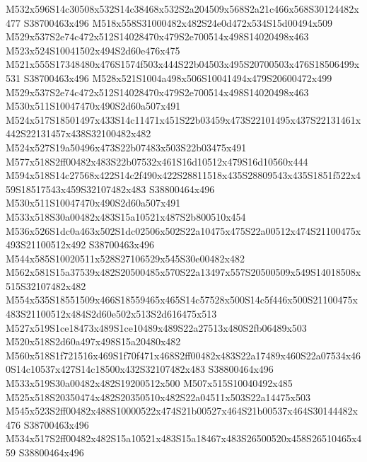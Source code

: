 \documentclass{article}
\begin{document}
\begin{multicols}{2}
M532x596S14c30508x532S14c38468x532S2a204509x568S2a21c466x568S30124482x477 S38700463x496 M518x558S31000482x482S24e0d472x534S15d00494x509 M529x537S2e74c472x512S14028470x479S2e700514x498S14020498x463 M523x524S10041502x494S2d60e476x475 M521x555S17348480x476S1574f503x444S22b04503x495S20700503x476S18506499x531 S38700463x496 M528x521S1004a498x506S10041494x479S20600472x499 M529x537S2e74c472x512S14028470x479S2e700514x498S14020498x463 M530x511S10047470x490S2d60a507x491 M524x517S18501497x433S14c11471x451S22b03459x473S22101495x437S22131461x442S22131457x438S32100482x482 M524x527S19a50496x473S22b07483x503S22b03475x491 M577x518S2ff00482x483S22b07532x461S16d10512x479S16d10560x444 M594x518S14c27568x422S14c2f490x422S28811518x435S28809543x435S1851f522x459S18517543x459S32107482x483 S38800464x496 M530x511S10047470x490S2d60a507x491 M533x518S30a00482x483S15a10521x487S2b800510x454 M536x526S1dc0a463x502S1dc02506x502S22a10475x475S22a00512x474S21100475x493S21100512x492 S38700463x496 M544x585S10020511x528S27106529x545S30e00482x482 M562x581S15a37539x482S20500485x570S22a13497x557S20500509x549S14018508x515S32107482x482 M554x535S18551509x466S18559465x465S14c57528x500S14c5f446x500S21100475x483S21100512x484S2d60e502x513S2d616475x513 M527x519S1ce18473x489S1ce10489x489S22a27513x480S2fb06489x503 M520x518S2d60a497x498S15a20480x482 M560x518S1f721516x469S1f70f471x468S2ff00482x483S22a17489x460S22a07534x460S14c10537x427S14c18500x432S32107482x483 S38800464x496 M533x519S30a00482x482S19200512x500 M507x515S10040492x485 M525x518S20350474x482S20350510x482S22a04511x503S22a14475x503 M545x523S2ff00482x488S10000522x474S21b00527x464S21b00537x464S30144482x476 S38700463x496 M534x517S2ff00482x482S15a10521x483S15a18467x483S26500520x458S26510465x459 S38800464x496







\end{multicols}
\end{document}

